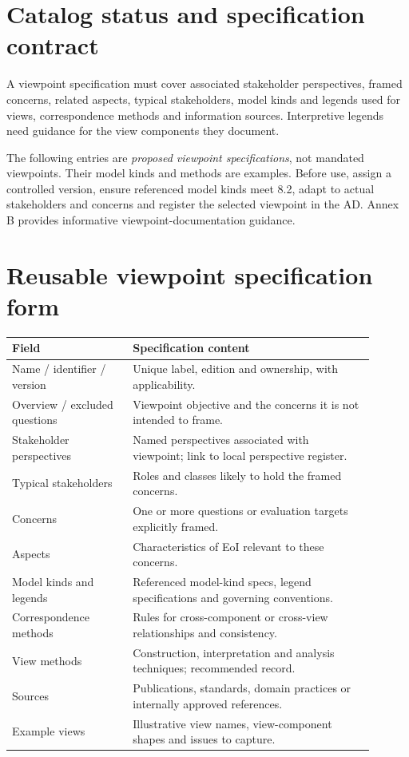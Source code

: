 \documentclass[11pt,letterpaper]{article}
\begin{document}
\InterpretationKey
\section{Catalog status and specification contract}
\begin{Requirement}\FlagReq{} A viewpoint specification must cover associated stakeholder perspectives, framed concerns, related aspects, typical stakeholders, model kinds and legends used for views, correspondence methods and information sources. Interpretive legends need guidance for the view components they document. \end{Requirement}
\begin{Guidance}The following entries are \emph{proposed viewpoint specifications}, not mandated viewpoints. Their model kinds and methods are examples. Before use, assign a controlled version, ensure referenced model kinds meet 8.2, adapt to actual stakeholders and concerns and register the selected viewpoint in the AD. Annex B provides informative viewpoint-documentation guidance.\end{Guidance}
\section{Reusable viewpoint specification form}
\begin{longtable}{p{0.30\linewidth}p{0.60\linewidth}}\toprule\textbf{Field}&\textbf{Specification content}\\\midrule\endhead
Name / identifier / version&Unique label, edition and ownership, with applicability.\\
Overview / excluded questions&Viewpoint objective and the concerns it is not intended to frame.\\
Stakeholder perspectives&Named perspectives associated with viewpoint; link to local perspective register.\\
Typical stakeholders&Roles and classes likely to hold the framed concerns.\\
Concerns&One or more questions or evaluation targets explicitly framed.\\
Aspects&Characteristics of EoI relevant to these concerns.\\
Model kinds and legends&Referenced model-kind specs, legend specifications and governing conventions.\\
Correspondence methods&Rules for cross-component or cross-view relationships and consistency.\\
View methods&Construction, interpretation and analysis techniques; recommended record.\\
Sources&Publications, standards, domain practices or internally approved references.\\
Example views&Illustrative view names, view-component shapes and issues to capture.\\\bottomrule\end{longtable}
\end{document}
